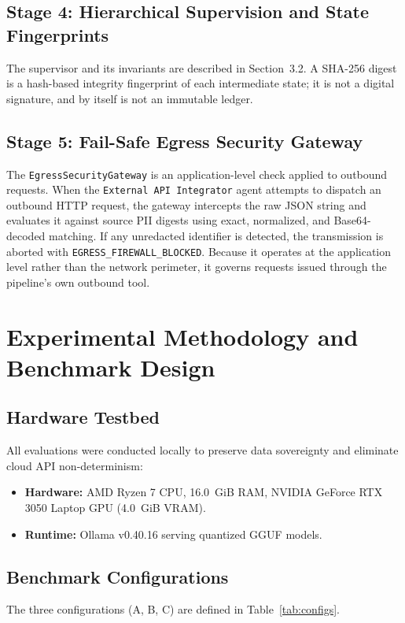 \documentclass[11pt,a4paper]{article}
\begin{document}
\subsection{Stage 4: Hierarchical Supervision and State Fingerprints}
The supervisor and its invariants are described in Section~3.2. A SHA-256 digest is a hash-based integrity fingerprint of each intermediate state; it is not a digital signature, and by itself is not an immutable ledger.

\subsection{Stage 5: Fail-Safe Egress Security Gateway}
The \texttt{EgressSecurityGateway} is an application-level check applied to outbound requests. When the \texttt{External API Integrator} agent attempts to dispatch an outbound HTTP request, the gateway intercepts the raw JSON string and evaluates it against source PII digests using exact, normalized, and Base64-decoded matching. If any unredacted identifier is detected, the transmission is aborted with \texttt{EGRESS\_FIREWALL\_BLOCKED}. Because it operates at the application level rather than the network perimeter, it governs requests issued through the pipeline's own outbound tool.

\section{Experimental Methodology and Benchmark Design}
\label{sec:method}

\subsection{Hardware Testbed}
All evaluations were conducted locally to preserve data sovereignty and eliminate cloud API non-determinism:
\begin{itemize}
    \item \textbf{Hardware:} AMD Ryzen 7 CPU, 16.0~GiB RAM, NVIDIA GeForce RTX 3050 Laptop GPU (4.0~GiB VRAM).
    \item \textbf{Runtime:} Ollama v0.40.16 serving quantized GGUF models.
\end{itemize}

\subsection{Benchmark Configurations}
The three configurations (A, B, C) are defined in Table~\ref{tab:configs}.
\end{document}

